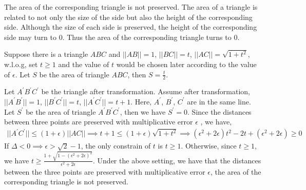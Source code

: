
The area of the corresponding triangle is not preserved.
The area of a triangle is related to not only the size of the side but also the height of the corresponding side.
Although the size of each side is preserved, the height of the corresponding side may turn to $0$.
Thus the area of the corresponding triangle turns to $0$.

Suppose there is a triangle $ABC$ and $||AB||=1$, $||BC||=t$, $||AC||=\sqrt{1+t^2}$, 
w.l.o.g, set $t\ge 1$ and the value of $t$ would be chosen later according to the value of $\epsilon$.
Let $S$ be the area of triangle $ABC$, then $S=\frac{t}{2}$.

Let $A^{\prime}B^{\prime}C^{\prime}$ be the triangle after transformation.
Assume after transformation, 
$||A^\prime B^\prime ||=1$, $||B^\prime C^\prime ||=t$, $||A^\prime C^\prime ||=t+1$. 
Here, $A^{\prime}$, $B^\prime$, $C^\prime$ are in the same line.
Let $S^\prime$ be the area of triangle $A^\prime B^\prime C^\prime$,
then we have $S^\prime=0$.
Since the distances between three points are preserved with multiplicative error $\epsilon$ , 
we have,
\begin{align}
    \nonumber ||A^\prime C^\prime||\le (1+\epsilon)||AC||\implies t+1 \le (1+\epsilon) \sqrt{1+t^2}\implies (\epsilon^2+2\epsilon)t^2-2t+(\epsilon^2+2\epsilon)\ge 0
\end{align}
If $\Delta<0\implies \epsilon > \sqrt{2}-1$, the only constrain of $t$ is $t\ge 1$.
Otherwise, 
since $t\ge1$, we have $t\ge \frac{1+\sqrt{1-(\epsilon^2+2\epsilon)^2}}{\epsilon^2+2\epsilon}$.
Under the above setting, we have that 
the distances between the three points are preserved with multiplicative error $\epsilon$,
the area of the corresponding triangle is not preserved.

